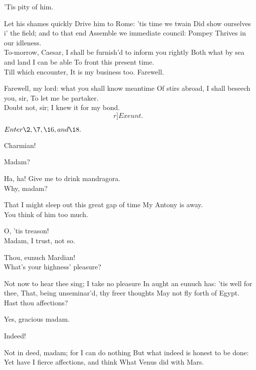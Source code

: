\documentclass{book}
\begin{document}
	'Tis pity of him.

\3	Let his shames quickly
	Drive him to Rome: 'tis time we twain
	Did show ourselves i' the field; and to that end
	Assemble we immediate council: Pompey
	Thrives in our idleness. \\

	To-morrow, Caesar,
	I shall be furnish'd to inform you rightly
	Both what by sea and land I can be able
	To front this present time. \\

\3	Till which encounter,
	It is my business too. Farewell.

	Farewell, my lord: what you shall know meantime
	Of stirs abroad, I shall beseech you, sir,
	To let me be partaker. \\

\3	Doubt not, sir;
	I knew it for my bond. 	\[r]Exeunt.\]





	\(Enter \2, \7, \16, and \18.\)

\2	Charmian! 

\7	Madam? 

\2	Ha, ha! 
	Give me to drink mandragora. \\

\7	Why, madam?

\2	That I might sleep out this great gap of time
	My Antony is away. \\

\7	                  You think of him too much.

\2	O, 'tis treason!  \\

\7	                  Madam, I trust, not so.

\2	Thou, eunuch Mardian! \\

	What's your highness' pleasure?

\2	Not now to hear thee sing; I take no pleasure
	In aught an eunuch has: 'tis well for thee,
	That, being unseminar'd, thy freer thoughts
	May not fly forth of Egypt. Hast thou affections?

	Yes, gracious madam.

\2	Indeed!

	Not in deed, madam; for I can do nothing
	But what indeed is honest to be done:
	Yet have I fierce affections, and think
	What Venus did with Mars. \\
\end{document}
